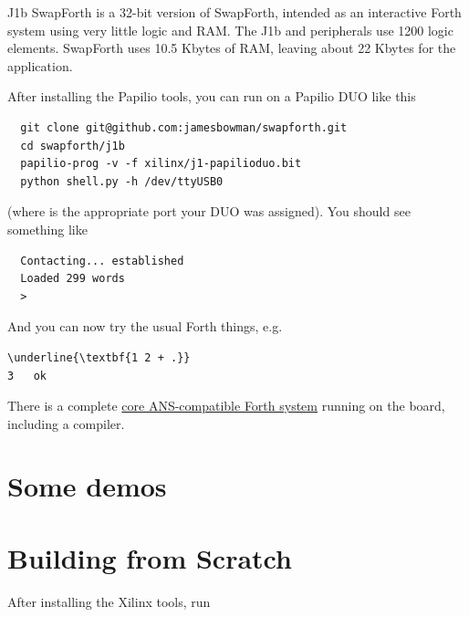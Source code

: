 J1b SwapForth is a 32-bit version of SwapForth,
intended as an interactive Forth system using very little logic and RAM.
The J1b and peripherals use 1200 logic elements.
SwapForth uses 10.5 Kbytes of RAM,
leaving about 22 Kbytes for the application. 

After installing the Papilio
tools, you can run on a
Papilio DUO
like this

\begin{framed}
\begin{Verbatim}
  git clone git@github.com:jamesbowman/swapforth.git
  cd swapforth/j1b
  papilio-prog -v -f xilinx/j1-papilioduo.bit
  python shell.py -h /dev/ttyUSB0
\end{Verbatim}
\end{framed}

\noindent
(where  is the appropriate port your DUO was assigned).
You should see something like

\begin{framed}
\begin{Verbatim}
  Contacting... established
  Loaded 299 words
  >
\end{Verbatim}
\end{framed}

And you can now try the usual Forth things, e.g.

\begin{framed}
\begin{Verbatim}[commandchars=\\\{\}]
\underline{\textbf{1 2 + .}}
3   ok
\end{Verbatim}
\end{framed}

There is a complete 
\href{http://forth.sourceforge.net/std/dpans/dpans6.htm}{core ANS-compatible Forth system}
running on the board, including a compiler.

\section{Some demos} 



\section{Building from Scratch}

After installing the Xilinx tools, run

